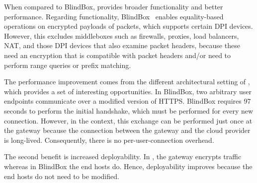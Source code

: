 When compared to BlindBox, \sys provides broader functionality and better performance. 
Regarding functionality, 
BlindBox~\cite{blindbox} enables equality-based operations on  encrypted payloads of packets, which supports certain DPI devices. However, this excludes middleboxes such as firewalls, proxies, load balancers, NAT,  and those DPI devices that also examine packet headers, because these need an encryption that is compatible with packet headers and/or need to perform range queries or prefix matching. 

 


%


The performance improvement comes from the different architectural setting of \sys, which provides a set of interesting opportunities.
 In BlindBox, two arbitrary user endpoints communicate over a modified version of HTTPS. BlindBox requires 97 seconds to perform the initial handshake, which  must be performed for every new connection.
However, in the \sys context, this exchange can be performed just once at the gateway because the connection between the gateway and the cloud provider is long-lived. Consequently, there is no per-user-connection overhead. 


The second benefit is increased deployability. In \sys, the gateway encrypts traffic whereas in BlindBox the end hosts do. Hence, deployability improves because the end hosts do not need to be modified.

